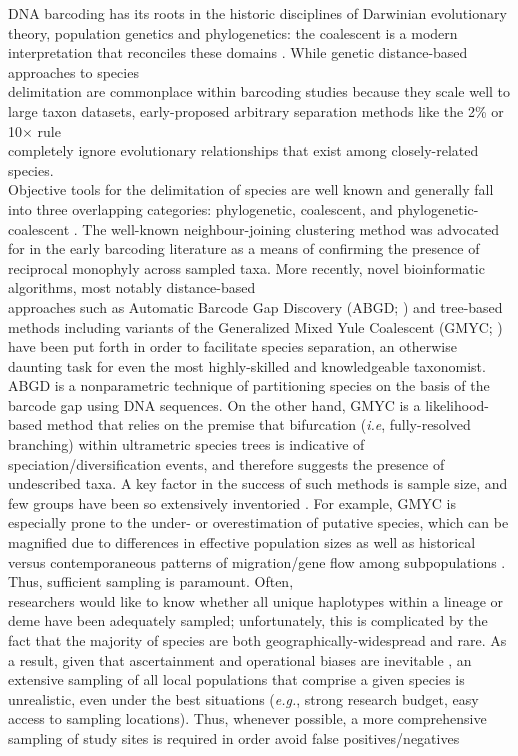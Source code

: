 DNA barcoding has its roots in the historic disciplines of Darwinian evolutionary \\ theory, population genetics and phylogenetics: the coalescent is a modern interpretation that reconciles these domains \cite{rosenberg2002genealogical}. While genetic distance-based approaches to species \\ delimitation are commonplace within barcoding studies because they scale well to large taxon datasets, early-proposed arbitrary separation methods like the 2\% or 10$\times$ rule \\ completely ignore evolutionary relationships that exist among closely-related species. \\ Objective tools for the delimitation of species are well known and generally fall into three overlapping categories: phylogenetic, coalescent, and phylogenetic-coalescent \cite{hubert2015dna}. The well-known neighbour-joining clustering method was advocated for in the early barcoding literature as a means of confirming the presence of reciprocal monophyly across sampled taxa. More recently, novel bioinformatic algorithms, most notably distance-based \\ approaches such as Automatic Barcode Gap Discovery (ABGD; \cite{puillandre2011abgd}) and tree-based \\ methods including variants of the Generalized Mixed Yule Coalescent (GMYC; \cite{monaghan2009accelerated, pons2006sequence}) have been put forth in order to facilitate species separation, an otherwise daunting task for even the most highly-skilled and knowledgeable taxonomist. ABGD is a nonparametric technique of partitioning species on the basis of the barcode gap using DNA sequences. On the other hand, GMYC is a likelihood-based method that relies on the premise that bifurcation (\textit{i.e}, fully-resolved branching) within ultrametric species trees is indicative of \\ speciation/diversification events, and therefore suggests the presence of undescribed taxa.  A key factor in the success of such methods is sample size, and few groups have been so extensively inventoried \cite{hubert2015dna}. For example, GMYC is especially prone to the under- or overestimation of putative species, which can be magnified due to differences in effective population sizes as well as historical versus contemporaneous patterns of migration/gene flow among subpopulations     \cite{lohse2009can, papadopoulou2009sampling}. Thus, sufficient sampling is paramount. Often, \\ researchers would like to know whether all unique haplotypes within a lineage or deme have been adequately sampled; unfortunately, this is complicated by the fact that the majority of species are both geographically-widespread and rare. As a result, given that ascertainment and operational biases are inevitable \cite{mutanen2016species}, an extensive sampling of all local populations that comprise a given species is unrealistic, even under the best situations (\textit{e.g.}, strong research budget, easy access to sampling locations). Thus, whenever possible, a more comprehensive sampling of study sites is required in order avoid false positives/negatives 